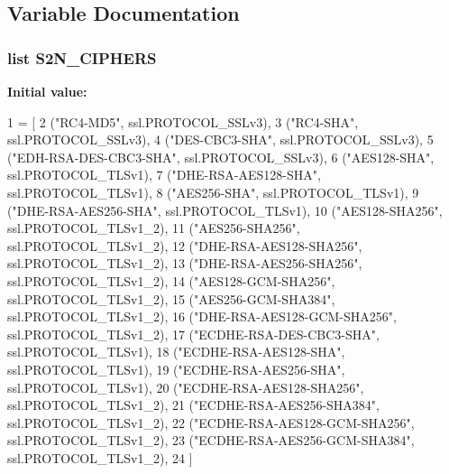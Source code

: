 \subsection{Variable Documentation}
\subsubsection[{\texorpdfstring{S2\+N\+\_\+\+C\+I\+P\+H\+E\+RS}{S2N_CIPHERS}}]{\setlength{\rightskip}{0pt plus 5cm}list S2\+N\+\_\+\+C\+I\+P\+H\+E\+RS}\hypertarget{namespaces2n__resume__test_adbfecdf840887c5e82f08e23e9d9430f}{}\label{namespaces2n__resume__test_adbfecdf840887c5e82f08e23e9d9430f}
{\bfseries Initial value\+:}
\begin{DoxyCode}
1 = [
2     (\textcolor{stringliteral}{"RC4-MD5"}, ssl.PROTOCOL\_SSLv3),
3     (\textcolor{stringliteral}{"RC4-SHA"}, ssl.PROTOCOL\_SSLv3),
4     (\textcolor{stringliteral}{"DES-CBC3-SHA"}, ssl.PROTOCOL\_SSLv3),
5     (\textcolor{stringliteral}{"EDH-RSA-DES-CBC3-SHA"}, ssl.PROTOCOL\_SSLv3),
6     (\textcolor{stringliteral}{"AES128-SHA"}, ssl.PROTOCOL\_TLSv1),
7     (\textcolor{stringliteral}{"DHE-RSA-AES128-SHA"}, ssl.PROTOCOL\_TLSv1),
8     (\textcolor{stringliteral}{"AES256-SHA"}, ssl.PROTOCOL\_TLSv1),
9     (\textcolor{stringliteral}{"DHE-RSA-AES256-SHA"}, ssl.PROTOCOL\_TLSv1),
10     (\textcolor{stringliteral}{"AES128-SHA256"}, ssl.PROTOCOL\_TLSv1\_2),
11     (\textcolor{stringliteral}{"AES256-SHA256"}, ssl.PROTOCOL\_TLSv1\_2),
12     (\textcolor{stringliteral}{"DHE-RSA-AES128-SHA256"}, ssl.PROTOCOL\_TLSv1\_2),
13     (\textcolor{stringliteral}{"DHE-RSA-AES256-SHA256"}, ssl.PROTOCOL\_TLSv1\_2),
14     (\textcolor{stringliteral}{"AES128-GCM-SHA256"}, ssl.PROTOCOL\_TLSv1\_2),
15     (\textcolor{stringliteral}{"AES256-GCM-SHA384"}, ssl.PROTOCOL\_TLSv1\_2),
16     (\textcolor{stringliteral}{"DHE-RSA-AES128-GCM-SHA256"}, ssl.PROTOCOL\_TLSv1\_2),
17     (\textcolor{stringliteral}{"ECDHE-RSA-DES-CBC3-SHA"}, ssl.PROTOCOL\_TLSv1),
18     (\textcolor{stringliteral}{"ECDHE-RSA-AES128-SHA"}, ssl.PROTOCOL\_TLSv1),
19     (\textcolor{stringliteral}{"ECDHE-RSA-AES256-SHA"}, ssl.PROTOCOL\_TLSv1),
20     (\textcolor{stringliteral}{"ECDHE-RSA-AES128-SHA256"}, ssl.PROTOCOL\_TLSv1\_2),
21     (\textcolor{stringliteral}{"ECDHE-RSA-AES256-SHA384"}, ssl.PROTOCOL\_TLSv1\_2),
22     (\textcolor{stringliteral}{"ECDHE-RSA-AES128-GCM-SHA256"}, ssl.PROTOCOL\_TLSv1\_2),
23     (\textcolor{stringliteral}{"ECDHE-RSA-AES256-GCM-SHA384"}, ssl.PROTOCOL\_TLSv1\_2),
24 ]
\end{DoxyCode}


